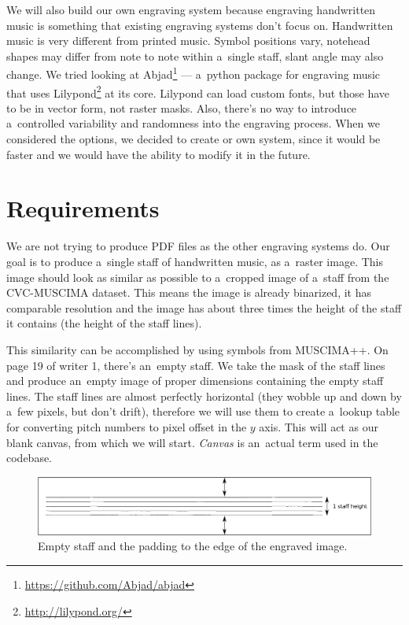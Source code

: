 We will also build our own engraving system because engraving handwritten music is something that existing engraving systems don't focus on. Handwritten music is very different from printed music. Symbol positions vary, notehead shapes may differ from note to note within a~single staff, slant angle may also change. We tried looking at Abjad\footnote{\href{https://github.com/Abjad/abjad}{https://github.com/Abjad/abjad}} --- a~python package for engraving music that uses Lilypond\footnote{\href{http://lilypond.org/}{http://lilypond.org/}} at its core. Lilypond can load custom fonts, but those have to be in vector form, not raster masks. Also, there's no way to introduce a~controlled variability and randomness into the engraving process. When we considered the options, we decided to create or own system, since it would be faster and we would have the ability to modify it in the future.


\section{Requirements}

We are not trying to produce PDF files as the other engraving systems do. Our goal is to produce a~single staff of handwritten music, as a~raster image. This image should look as similar as possible to a~cropped image of a~staff from the CVC-MUSCIMA dataset. This means the image is already binarized, it has comparable resolution and the image has about three times the height of the staff it contains (the height of the staff lines).

This similarity can be accomplished by using symbols from MUSCIMA++. On page 19 of writer 1, there's an~empty staff. We take the mask of the staff lines and produce an~empty image of proper dimensions containing the empty staff lines. The staff lines are almost perfectly horizontal (they wobble up and down by a~few pixels, but don't drift), therefore we will use them to create a~lookup table for converting pitch numbers to pixel offset in the $y$ axis. This will act as our blank canvas, from which we will start. \emph{Canvas} is an~actual term used in the codebase.

\begin{figure}[h]
    \centering
    \includegraphics[width=140mm]{../img/staff-padding}
    \caption{Empty staff and the padding to the edge of the engraved image.}
    \label{fig5:EmptyStaffWithPadding}
\end{figure}

